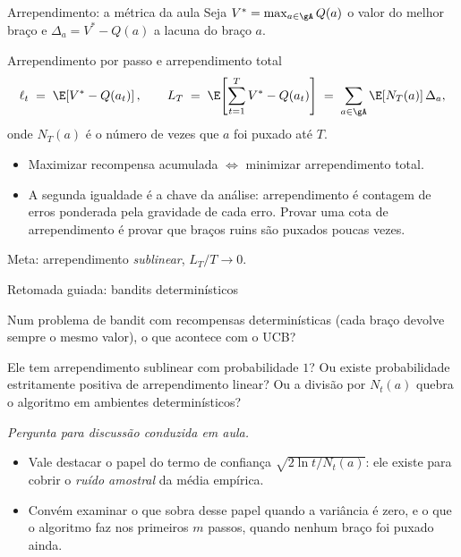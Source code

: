 \documentclass[aspectratio=169, 11pt]{beamer}
\newcommand{\paradiscussao}{\smallskip
  {\footnotesize\color{rlCinza}\itshape Pergunta para discussão conduzida em aula.}}
\newcommand{\Vmax}{V^{*}}
\begin{document}
\begin{frame}{Arrependimento: a métrica da aula}
  Seja $\Vmax = \max_{a \in \gA} Q(a)$ o valor do melhor braço e
  $\Delta_a = \Vmax - Q(a)$ a \alert{lacuna} do braço $a$.

  \begin{defbox}{Arrependimento por passo e arrependimento total}
    \[
      \ell_t \;=\; \E\!\left[\Vmax - Q(a_t)\right],
      \qquad
      L_T \;=\; \E\!\left[\sum_{t=1}^{T} \Vmax - Q(a_t)\right]
              \;=\; \sum_{a \in \gA} \E[N_T(a)]\,\Delta_a ,
    \]
    onde $N_T(a)$ é o número de vezes que $a$ foi puxado até $T$.
  \end{defbox}

  \begin{itemize}
    \item Maximizar recompensa acumulada $\iff$ minimizar arrependimento
          total.
    \item A segunda igualdade é a chave da análise: \alert{arrependimento é
          contagem de erros ponderada pela gravidade de cada erro}. Provar
          uma cota de arrependimento é provar que braços ruins são puxados
          poucas vezes.
  \end{itemize}

  \smallskip
  {\small\color{rlCinza} Meta: arrependimento \emph{sublinear},
  $L_T/T \to 0$.}
\end{frame}

\begin{frame}{Retomada guiada: bandits determinísticos}
  \begin{quizbox}{}
    Num problema de bandit com recompensas \alert{determinísticas} (cada
    braço devolve sempre o mesmo valor), o que acontece com o UCB?

    \smallskip
    Ele tem arrependimento sublinear com probabilidade $1$? Ou existe
    probabilidade estritamente positiva de arrependimento linear? Ou a
    divisão por $N_t(a)$ quebra o algoritmo em ambientes determinísticos?
  \end{quizbox}
  \paradiscussao

  \medskip
  \begin{itemize}
    \item Vale destacar o papel do termo de confiança
          $\sqrt{2\ln t / N_t(a)}$: ele existe para cobrir o
          \emph{ruído amostral} da média empírica.
    \item Convém examinar o que sobra desse papel quando a variância é
          zero, e o que o algoritmo faz nos primeiros $m$ passos, quando
          nenhum braço foi puxado ainda.
  \end{itemize}
\end{frame}
\end{document}
